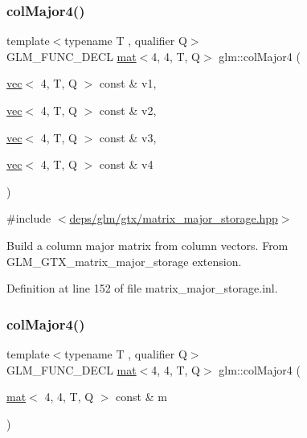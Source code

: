 \subsubsection{\texorpdfstring{col\+Major4()}{colMajor4()}\hspace{0.1cm}{\footnotesize\ttfamily [1/2]}}
{\footnotesize\ttfamily template$<$typename T , qualifier Q$>$ \\
G\+L\+M\+\_\+\+F\+U\+N\+C\+\_\+\+D\+E\+CL \hyperlink{structglm_1_1mat}{mat}$<$4, 4, T, Q$>$ glm\+::col\+Major4 (\begin{DoxyParamCaption}\item[{\hyperlink{structglm_1_1vec}{vec}$<$ 4, T, Q $>$ const \&}]{v1,  }\item[{\hyperlink{structglm_1_1vec}{vec}$<$ 4, T, Q $>$ const \&}]{v2,  }\item[{\hyperlink{structglm_1_1vec}{vec}$<$ 4, T, Q $>$ const \&}]{v3,  }\item[{\hyperlink{structglm_1_1vec}{vec}$<$ 4, T, Q $>$ const \&}]{v4 }\end{DoxyParamCaption})}



{\ttfamily \#include $<$\hyperlink{matrix__major__storage_8hpp}{deps/glm/gtx/matrix\+\_\+major\+\_\+storage.\+hpp}$>$}

Build a column major matrix from column vectors. From G\+L\+M\+\_\+\+G\+T\+X\+\_\+matrix\+\_\+major\+\_\+storage extension. 

Definition at line 152 of file matrix\+\_\+major\+\_\+storage.\+inl.

\mbox{\label{group__gtx__matrix__major__storage_gaf3f9511c366c20ba2e4a64c9e4cec2b3}} 
\subsubsection{\texorpdfstring{col\+Major4()}{colMajor4()}\hspace{0.1cm}{\footnotesize\ttfamily [2/2]}}
{\footnotesize\ttfamily template$<$typename T , qualifier Q$>$ \\
G\+L\+M\+\_\+\+F\+U\+N\+C\+\_\+\+D\+E\+CL \hyperlink{structglm_1_1mat}{mat}$<$4, 4, T, Q$>$ glm\+::col\+Major4 (\begin{DoxyParamCaption}\item[{\hyperlink{structglm_1_1mat}{mat}$<$ 4, 4, T, Q $>$ const \&}]{m }\end{DoxyParamCaption})}



